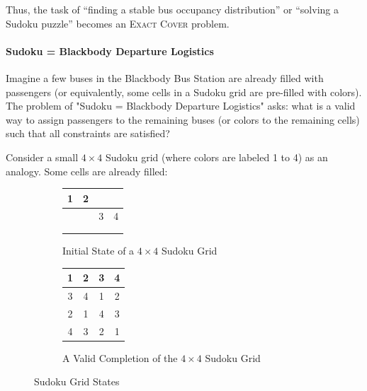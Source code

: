 \documentclass{report}
\begin{document}
Thus, the task of ``finding a stable bus occupancy distribution'' or ``solving a Sudoku puzzle'' becomes an \textsc{Exact Cover} problem.

\paragraph{Sudoku = Blackbody Departure Logistics}

Imagine a few buses in the Blackbody Bus Station are already filled with passengers (or equivalently, some cells in a Sudoku grid are pre-filled with colors). The problem of "Sudoku = Blackbody Departure Logistics" asks: what is a valid way to assign passengers to the remaining buses (or colors to the remaining cells) such that all constraints are satisfied?

Consider a small \(4 \times 4\) Sudoku grid (where colors are labeled 1 to 4) as an analogy. Some cells are already filled:

\begin{figure}[H]
    \centering
    \begin{subfigure}{0.45\textwidth}
        \centering
        \begin{tabularx}{0.34\textwidth}{|c|c|c|c|}
            \hline
            1 & 2 &   &   \\ \hline
              &   & 3 & 4 \\ \hline
              &   &   &   \\ \hline
              &   &   &   \\ \hline
        \end{tabularx}
        \caption{Initial State of a \(4 \times 4\) Sudoku Grid}
        \label{fig:initial_sudoku}
    \end{subfigure}
    \quad
    \begin{subfigure}{0.45\textwidth}
        \centering
        \begin{tabularx}{0.34\textwidth}{|c|c|c|c|}
            \hline
            1 & 2 & 3 & 4 \\ \hline
            3 & 4 & 1 & 2 \\ \hline
            2 & 1 & 4 & 3 \\ \hline
            4 & 3 & 2 & 1 \\ \hline
        \end{tabularx}
        \caption{A Valid Completion of the \(4 \times 4\) Sudoku Grid}
        \label{fig:completed_sudoku}
    \end{subfigure}
    \caption{Sudoku Grid States}
    \label{fig:sudoku_states}
\end{figure}
\end{document}

